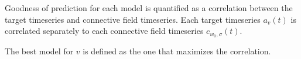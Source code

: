 \documentclass[biblatex]{lni}
\begin{document}
Goodness of prediction for each model is quantified as a correlation between the target timeseries and connective field timeseries. Each target timeseries $a_v(t)$ is correlated separately to each connective field timeseries $c_{w_0,\sigma}(t)$. 

The best model for $v$ is defined as the one that maximizes the correlation.






\printbibliography
\end{document}
